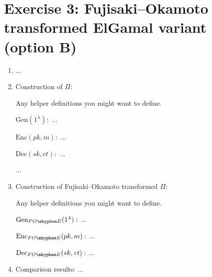 \documentclass[11pt]{article}
\newcommand{\Gen}{\mathrm{Gen}}
\newcommand{\Enc}{\mathrm{Enc}}
\newcommand{\Dec}{\mathrm{Dec}}
\newcommand{\secpar}{\lambda}
\newcommand{\pk}{pk}
\newcommand{\sk}{sk}
\newcommand{\ct}{\mathit{ct}}
\newcommand{\foe}{\ensuremath{FO\mhyphen E}}
\begin{document}
\section*{Exercise 3: Fujisaki--Okamoto transformed ElGamal variant (option B)}
\begin{enumerate}
\item ...
\item Construction of $\Pi$:
\begin{framed}
  Any helper definitions you might want to define.
  
  \({\Gen(1^\secpar)}:\) ...
  
  \(\Enc(\pk, m):\) ...
  
  \(\Dec(\sk, \ct):\) ...
\end{framed}
... %

\item Construction of Fujisaki--Okamoto transformed $\Pi$:
\begin{framed}
  Any helper definitions you might want to define.
  
  \({\Gen_{\foe}(1^\secpar)}:\) ...
  
  \(\Enc_{\foe}(\pk, m):\) ...
  
  \(\Dec_{\foe}(\sk, \ct):\) ...
\end{framed}
\item %
Comparison results: ...
\end{enumerate}
\end{document}
